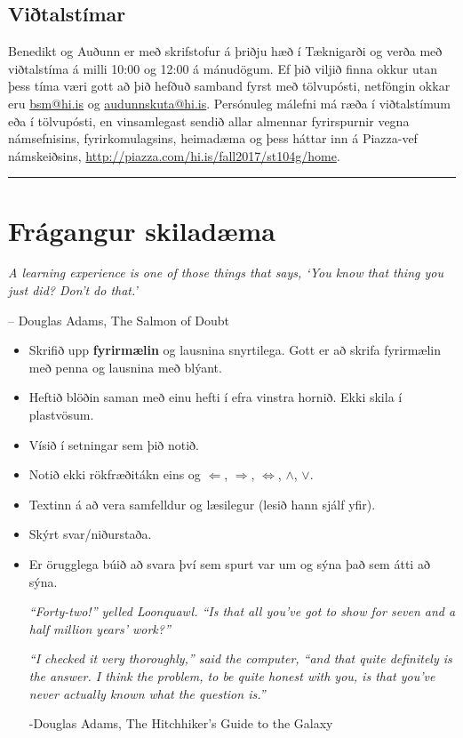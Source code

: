 \documentclass[b5paper,10pt,icelandic]{sphinxmanual}
\begin{document}
\subsection{Viðtalstímar}
\label{vidauki:vitalstimar}
Benedikt og Auðunn er með skrifstofur á þriðju hæð í Tæknigarði
og verða með viðtalstíma á milli 10:00 og 12:00 á
mánudögum. Ef þið viljið finna okkur utan þess tíma væri gott að þið
hefðuð samband fyrst með tölvupósti, netföngin okkar eru \href{mailto:bsm@hi.is}{bsm@hi.is}
og \href{mailto:audunnskuta@hi.is}{audunnskuta@hi.is}. 
Persónuleg málefni má ræða í viðtalstímum eða í
tölvupósti, en vinsamlegast sendið allar almennar fyrirspurnir vegna
námsefnisins, fyrirkomulagsins, heimadæma og þess háttar inn á Piazza-vef
námskeiðsins, \href{http://piazza.com/hi.is/fall2017/st104g/home}{http://piazza.com/hi.is/fall2017/st104g/home}.


\bigskip\hrule{}\bigskip

\newpage

\section{Frágangur skiladæma}
\label{vidauki:fragangur-skiladaema}\label{vidauki:fragangurskiladaema}
\emph{A learning experience is one of those things that says,
`You know that thing you just did? Don't do that.'}

-- Douglas Adams, The Salmon of Doubt
\begin{itemize}
\item {} 
Skrifið upp \textbf{fyrirmælin} og lausnina snyrtilega. Gott er að skrifa fyrirmælin
með penna og lausnina með blýant.

\item {} 
Heftið blöðin saman með einu hefti í efra vinstra hornið. Ekki skila í plastvösum.

\item {} 
Vísið í setningar sem þið notið.

\item {} 
Notið ekki rökfræðitákn eins og \(\Leftarrow\),
\(\Rightarrow\), \(\Leftrightarrow\), \(\wedge\),
\(\vee\).

\item {} 
Textinn á að vera samfelldur og læsilegur (lesið hann sjálf yfir).

\item {} 
Skýrt svar/niðurstaða.

\item {} 
Er örugglega búið að svara því sem spurt var um og sýna það sem átti að sýna.

\emph{“Forty-two!” yelled Loonquawl. “Is that all you’ve got to show for
seven and a half million years’ work?”}

\emph{“I checked it very thoroughly,” said the computer, “and that quite
definitely is the answer. I think the problem, to be quite honest with
you, is that you’ve never actually known what the question is.”}

-Douglas Adams, The Hitchhiker's Guide to the Galaxy

\end{itemize}
\end{document}
